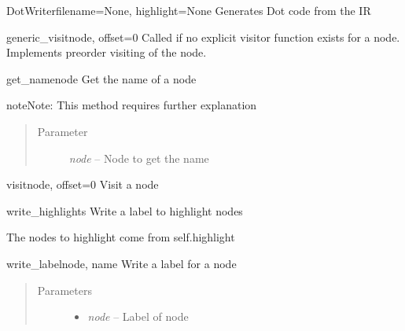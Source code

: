 \documentclass[a4paper,10pt,english]{manual}
\begin{document}
\hypertarget{Backends.DotBackend.Writers.DotWriter.DotWriter}{}\begin{classdesc}{DotWriter}{filename=None, highlight=None}
Generates Dot code from the IR

\hypertarget{Backends.DotBackend.Writers.DotWriter.DotWriter.generic\_visit}{}\begin{methoddesc}{generic\_visit}{node, offset=0}
Called if no explicit visitor function exists for a 
node. Implements preorder visiting of the node.
\end{methoddesc}

\hypertarget{Backends.DotBackend.Writers.DotWriter.DotWriter.get\_name}{}\begin{methoddesc}{get\_name}{node}
Get the name of a node

\begin{notice}{note}{Note:}
This method requires further explanation
\end{notice}
\begin{quote}\begin{description}
\item[Parameter] \leavevmode
\emph{node} -- Node to get the name

\end{description}\end{quote}
\end{methoddesc}

\hypertarget{Backends.DotBackend.Writers.DotWriter.DotWriter.visit}{}\begin{methoddesc}{visit}{node, offset=0}
Visit a node
\end{methoddesc}

\hypertarget{Backends.DotBackend.Writers.DotWriter.DotWriter.write\_highlights}{}\begin{methoddesc}{write\_highlights}{}
Write a label to highlight nodes

The nodes to highlight come from self.highlight
\end{methoddesc}

\hypertarget{Backends.DotBackend.Writers.DotWriter.DotWriter.write\_label}{}\begin{methoddesc}{write\_label}{node, name}
Write a label for a node
\begin{quote}\begin{description}
\item[Parameters] \leavevmode\begin{itemize}
\item {} 
\emph{node} -- Label of node


\end{itemize}
\end{description}
\end{quote}
\end{methoddesc}
\end{classdesc}
\end{document}
